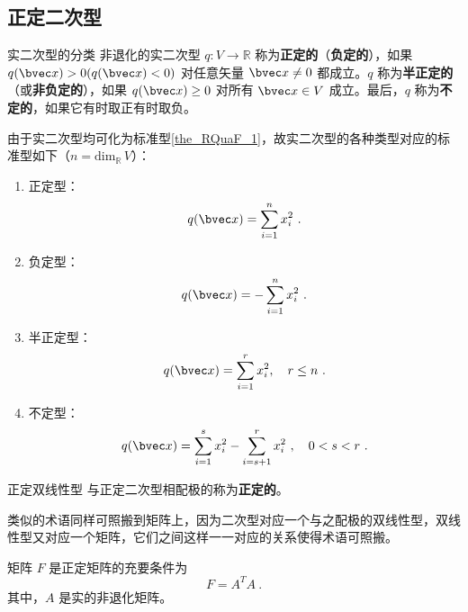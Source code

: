 
\begin{issues}
\end{issues}

\subsection{正定二次型}
\begin{definition}{实二次型的分类}\label{def_DeQua_2}
非退化的实二次型 $q:V\rightarrow\mathbb R$ 称为\textbf{正定的}（\textbf{负定的}），如果 $q(\bvec x)>0(q(\bvec x)<0)$ 对任意矢量 $\bvec x\neq0$ 都成立。$q$ 称为\textbf{半正定的}（或\textbf{非负定的}），如果 $q(\bvec x)\geq0$ 对所有 $\bvec x\in V$ 成立。最后，$q$ 称为\textbf{不定的}，如果它有时取正有时取负。
\end{definition}
由于实二次型均可化为标准型\autoref{the_RQuaF_1}，故实二次型的各种类型对应的标准型如下（$n=\mathrm{dim}_\mathbb R \,V$）：
\begin{enumerate}
\item 正定型：\begin{equation}\label{eq_DeQua_1}
q(\bvec x)=\sum_{i=1}^n x_i^2~.
\end{equation}
\item 负定型：\begin{equation}
q(\bvec x)=-\sum_{i=1}^n x_i^2~.
\end{equation}
\item 半正定型：\begin{equation}
q(\bvec x)=\sum_{i=1}^r x_i^2,\quad r\leq n~.
\end{equation}
\item 不定型：\begin{equation}
q(\bvec x)=\sum_{i=1}^s x_i^2-\sum_{i=s+1}^r x_i^2~,\quad0<s< r~.
\end{equation}
\end{enumerate}
\begin{definition}{正定双线性型}\label{def_DeQua_1}
与正定二次型相配极的称为\textbf{正定的}。
\end{definition}
类似的术语同样可照搬到矩阵上，因为二次型对应一个与之配极的双线性型，双线性型又对应一个矩阵，它们之间这样一一对应的关系使得术语可照搬。
\begin{theorem}{}
矩阵 $F$ 是正定矩阵的充要条件为
\begin{equation}
F=A^TA~.
\end{equation}
其中，$A$ 是实的非退化矩阵。
\end{theorem}
